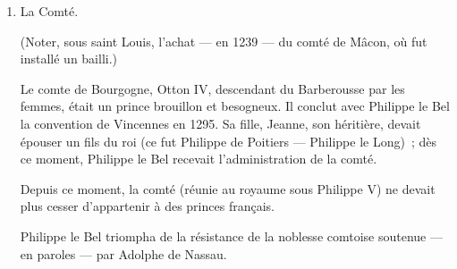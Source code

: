 \documentclass[french,twoside]{book} %
\begin{document}
\begin{enumerate}[itemsep=\baselineskip,]
 
\item  La Comté.\par
 (Noter, sous saint Louis, l’achat — en 1239 — du comté de Mâcon, où fut installé un bailli.)\par
 Le comte de Bourgogne, Otton IV, descendant du Barberousse par les femmes, était un prince brouillon et besogneux. Il conclut avec Philippe le Bel la convention de Vincennes en 1295. Sa fille, Jeanne, son héritière, devait épouser un fils du roi (ce fut Philippe de Poitiers — Philippe le Long) ; dès ce moment, Philippe le Bel recevait l’administration de la comté.\par
 Depuis ce moment, la comté (réunie au royaume sous Philippe V) ne devait plus cesser d’appartenir à des princes français.\par
 Philippe le Bel triompha de la résistance de la noblesse comtoise soutenue — en paroles — par Adolphe de Nassau.
 

\end{enumerate}
\end{document}
